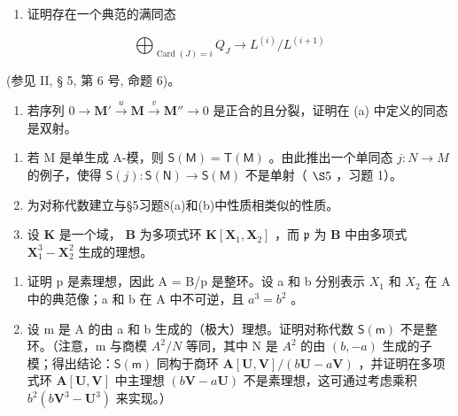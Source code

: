 \begin{enumerate}
\def\labelenumi{(\alph{enumi})}
\tightlist
\item
  证明存在一个典范的满同态
\end{enumerate}

\[
\bigoplus_ {\operatorname{Card} (J) = i} Q _ {J} \rightarrow L ^ {(i)} / L ^ {(i + 1)}
\]

(参见 II, § 5, 第 6 号, 命题 6)。

\begin{enumerate}
\def\labelenumi{(\alph{enumi})}
\setcounter{enumi}{1}
\tightlist
\item
  若序列 \(0 \to \mathbf{M}' \xrightarrow{u} \mathbf{M} \xrightarrow{v} \mathbf{M}'' \to 0\) 是正合的且分裂，证明在 (a) 中定义的同态是双射。
\end{enumerate}

\BourbakiExercisesSection

\begin{enumerate}
\def\labelenumi{\arabic{enumi}.}
\item
  若 M 是单生成 A-模，则 \(\mathsf{S}(\mathsf{M}) = \mathsf{T}(\mathsf{M})\) 。由此推出一个单同态 \(j: N \to M\) 的例子，使得 \(\mathsf{S}(j): \mathsf{S}(\mathsf{N}) \to \mathsf{S}(\mathsf{M})\) 不是单射（ \(\S 5\) ，习题 1）。
\item
  为对称代数建立与§5习题8(a)和(b)中性质相类似的性质。
\item
  设 \(\mathbf{K}\) 是一个域， \(\mathbf{B}\) 为多项式环 \(\mathbf{K}[\mathbf{X}_1, \mathbf{X}_2]\) ，而 \(\mathfrak{p}\) 为 \(\mathbf{B}\) 中由多项式 \(\mathbf{X}_1^3 - \mathbf{X}_2^2\) 生成的理想。
\end{enumerate}

\begin{enumerate}
\def\labelenumi{(\alph{enumi})}
\item
  证明 p 是素理想，因此 A = B/p 是整环。设 a 和 b 分别表示 \(X_{1}\) 和 \(X_{2}\) 在 A 中的典范像；a 和 b 在 A 中不可逆，且 \(a^{3} = b^{2}\) 。
\item
  设 m 是 A 的由 a 和 b 生成的（极大）理想。证明对称代数 \(\mathsf{S}(\mathsf{m})\) 不是整环。（注意，m 与商模 \(A^{2}/N\) 等同，其中 N 是 \(A^{2}\) 的由 \((b, -a)\) 生成的子模；得出结论：\(\mathsf{S}(\mathsf{m})\) 同构于商环 \(\mathbf{A}[\mathbf{U}, \mathbf{V}]/(b\mathbf{U} - a\mathbf{V})\) ，并证明在多项式环 \(\mathbf{A}[\mathbf{U}, \mathbf{V}]\) 中主理想 \((b\mathbf{V} - a\mathbf{U})\) 不是素理想，这可通过考虑乘积 \(b^{2}(b\mathbf{V}^{3} - \mathbf{U}^{3})\) 来实现。）
\end{enumerate}


